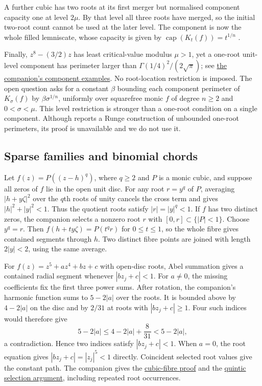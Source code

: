 \documentclass[11pt]{article}
\newcommand{\recordlink}[3]{\href{#1\##2}{#3}}
\begin{document}
\noindent{}\label{res:arity-not-capacity}
A further cubic has two roots at its first merger but
normalised component capacity one at level $2\mu$. By that level all three roots have merged, so the initial two-root count
cannot be used at the later level. The component is now the whole filled
lemniscate, whose capacity is given by
$\operatorname{cap}(K_t(f))=t^{1/n}$
\cite[Theorem~5.2.5 and p.~153]{ransford1995}.


\noindent{}\label{res:one-root-gamma-false}
Finally, $z^8-(3/2)z$ has least critical-value modulus $\mu>1$, yet a
one-root unit-level component has perimeter larger than
$\Gamma(1/4)^2/(2\sqrt\pi)$; see
\recordlink{erdos1041-lemniscate-reasoning-surface.pdf}{component-counterexamples}
{the companion's component examples}. No root-location restriction is imposed.
The open question asks for a constant $\beta$ bounding each component
perimeter of $K_\sigma(f)$ by $\beta\sigma^{1/n}$, uniformly over
squarefree monic $f$ of degree $n\ge2$ and $0<\sigma<\mu$.
This level restriction is stronger than a one-root condition on a single
component. Although \cite[Proposition~2]{revision2026} reports a Runge
construction of unbounded one-root perimeters, its proof is unavailable
and we do not use it.

\subsection{Sparse families and binomial chords}\label{sec:solved-families}\label{sec:binomial}
\noindent{}\label{res:cubic-fibres}
Let $f(z)=P((z-h)^q)$, where $q\ge2$ and $P$ is a monic cubic,
and suppose all zeros of $f$ lie in the open unit disc. For any root
$r=y^q$ of $P$, averaging $|h+y\zeta|^2$ over the $q$th roots of
unity cancels the cross term and gives $|h|^2+|y|^2<1$. Thus the
quotient roots satisfy $|r|=|y|^q<1$.
If $f$ has two distinct zeros, the companion selects a nonzero root
$r$ with $[0,r]\subset\{|P|<1\}$. Choose $y^q=r$. Then
$f(h+ty\zeta)=P(t^qr)$ for $0\le t\le1$, so the whole fibre gives
contained segments through $h$. Two distinct fibre points are joined
with length $2|y|<2$, using the same average.

\noindent{}\label{res:primitive-quintic}
For $f(z)=z^5+az^4+bz+c$ with open-disc roots, Abel summation
gives a contained radial segment whenever $|bz_j+c|<1$.
For $a\ne0$, the missing coefficients fix the first three power sums.
After rotation, the companion's harmonic function sums to $5-2|a|$
over the roots. It is bounded above by $4-2|a|$ on the disc and by
$2/31$ at roots with $|bz_j+c|\ge1$. Four such indices would therefore give
\[
 5-2|a|\le4-2|a|+\frac8{31}<5-2|a|,
\]
a contradiction. Hence two indices satisfy $|bz_j+c|<1$.
When $a=0$, the root equation gives $|bz_j+c|=|z_j|^5<1$ directly.
Coincident selected root values give the constant path.
The companion gives the
\recordlink{erdos1041-lemniscate-reasoning-surface.pdf}{cubic-fibre-proof}
{cubic-fibre proof} and the
\recordlink{erdos1041-lemniscate-reasoning-surface.pdf}{quintic-proof}
{quintic selection argument}, including repeated root occurrences.
\end{document}
